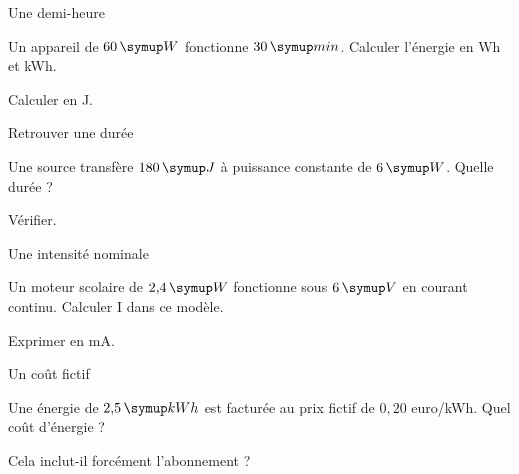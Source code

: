 \par\noindent\begin{minipage}{\linewidth}
\begin{exercice}[2]{Une demi-heure}
\begin{questions}
\item Un appareil de $60\unite W$ fonctionne $30\unite{min}$. Calculer l’énergie en Wh et kWh.
\item Calculer en J.
\end{questions}
\end{exercice}
\end{minipage}
\par\noindent\begin{minipage}{\linewidth}
\begin{exercice}[2]{Retrouver une durée}
\begin{questions}
\item Une source transfère $180\unite J$ à puissance constante de $6\unite W$. Quelle durée ?
\item Vérifier.
\end{questions}
\end{exercice}
\end{minipage}
\par\noindent\begin{minipage}{\linewidth}
\begin{exercice}[2]{Une intensité nominale}
\begin{questions}
\item Un moteur scolaire de $2{,}4\unite W$ fonctionne sous $6\unite V$ en courant continu. Calculer I dans ce modèle.
\item Exprimer en mA.
\end{questions}
\end{exercice}
\end{minipage}
\par\noindent\begin{minipage}{\linewidth}
\begin{exercice}[2]{Un coût fictif}
\begin{questions}
\item Une énergie de $2{,}5\unite{kWh}$ est facturée au prix fictif de $0{,}20$ euro/kWh. Quel coût d’énergie ?
\item Cela inclut-il forcément l’abonnement ?
\end{questions}
\end{exercice}
\end{minipage}
\clearpage{}
